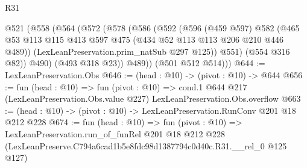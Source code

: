 \begin{lexlean}{R31}
\begin{coremodule}
      @521
        (@558
          (@564
            (@572
              (@578
                (@586
                  (@592
                    (@596
                      (@459 @597)
                      @582
                      (@465 @53 @113 @115 @413 @597 @475 (@434 @52 @113 @113 @206 @210 @446 @489))
                      (LexLeanPreservation.prim_natSub @297 @125))
                    @551)
                  (@554 @316 @82))
                @490)
              (@493 @318 @23))
            @489))
        (@501 @512 @514)))
@644 := LexLeanPreservation.Obs
@646 := (head : @10) -> (pivot : @10) -> @644
@656 := fun (head : @10) =>
  fun (pivot : @10) =>
  cond.{1} @644 @217 (LexLeanPreservation.Obs.value @227) LexLeanPreservation.Obs.overflow
@663 := (head : @10) -> (pivot : @10) -> LexLeanPreservation.RunConv @201 @18 @212 @228
@674 := fun (head : @10) =>
  fun (pivot : @10) =>
  LexLeanPreservation.run_of_funRel
    @201
    @18
    @212
    @228
    (LexLeanPreserve.C794a6cad1b5e8fdc98d1387794c0d40c.R31.__rel_0 @125 @127)
\end{coremodule}
\end{lexlean}
